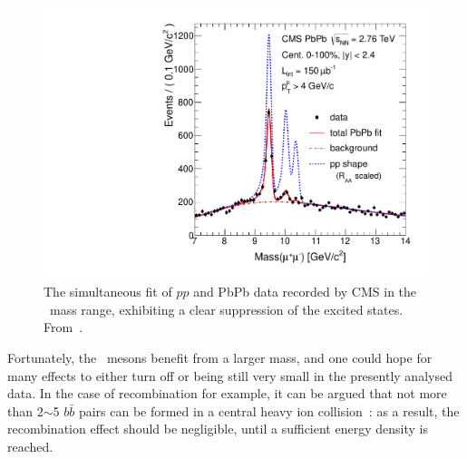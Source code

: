 \begin{figure}[t]
\begin{center}
  \includegraphics[height=0.4\textheight]{Chapters/pQuarkonia/simultaneousfit2011.pdf}
  \caption{The simultaneous fit of $pp$ and PbPb data recorded by CMS in the \PgU~mass
    range, exhibiting a clear suppression of the excited states. From~\cite{11-011}.}
  \label{fig:hinupsilons}
\end{center}
\end{figure}



Fortunately, the \PgU~mesons benefit from a larger mass, and one could
hope for many effects to either turn off or being still very small in
the presently analysed data. In the case of recombination for
example, it can be argued that not more than 2$\sim$5 $b\bar{b}$ pairs
can be formed in a central heavy ion collision~\cite{Denterria:2007xr}: as a result, the
recombination effect should be negligible, until a sufficient energy
density is reached.%




